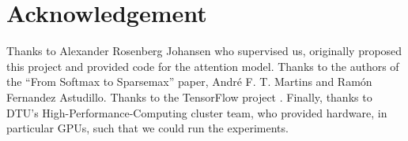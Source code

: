 \section{Acknowledgement}

Thanks to Alexander Rosenberg Johansen who supervised us, originally proposed this project and provided code for the attention model. Thanks to the authors of the ``From Softmax to Sparsemax'' \cite{sparsemax} paper, André F. T. Martins and Ramón Fernandez Astudillo. Thanks to the TensorFlow project \cite{tensorflow2015-whitepaper}. Finally, thanks to DTU’s High-Performance-Computing cluster team, who provided hardware, in particular GPUs, such that we could run the experiments.